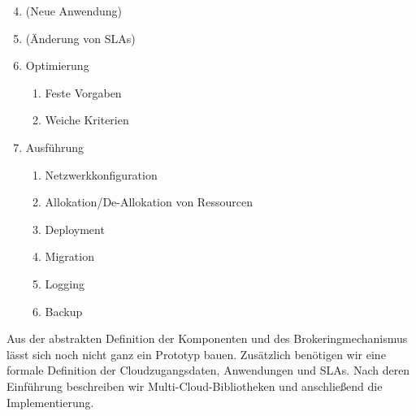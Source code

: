 \begin{minipage}[b]{0.45\linewidth}	
\begin{enumerate}
\setcounter{enumi}{3}
\item (Neue Anwendung)
\item (Änderung von SLAs)
\item Optimierung
\begin{enumerate}
	\item Feste Vorgaben%
	\item Weiche Kriterien%
\end{enumerate}
\item Ausführung
\begin{enumerate}
	\item Netzwerkkonfiguration
	\item Allokation/De-Allokation von Ressourcen
	\item Deployment
	\item Migration
	\item Logging%
	\item Backup
\end{enumerate}
\end{enumerate}
\end{minipage}

\vspace{0.5cm}

\noindent
Aus der abstrakten Definition der Komponenten und des Brokeringmechanismus lässt sich noch nicht ganz ein Prototyp bauen. Zusätzlich benötigen wir eine formale Definition der Cloudzugangsdaten, Anwendungen und SLAs. Nach deren Einführung beschreiben wir Multi-Cloud-Bibliotheken und anschließend die Implementierung.
